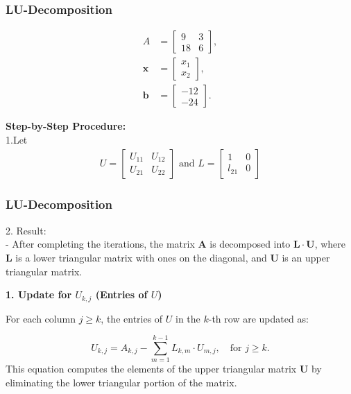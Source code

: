 \documentclass{beamer}
\theoremstyle{remark}
\numberwithin{equation}{section}
\begin{document}
\begin{frame}
\frametitle{LU-Decomposition}


\begin{align}
		A &= \begin{bmatrix} 9 & 3 \\ 18 & 6 \end{bmatrix}, \\
		\mathbf{x} &= \begin{bmatrix} x_1 \\ x_2 \end{bmatrix}, \\
		\mathbf{b} &= \begin{bmatrix} -12 \\ -24 \end{bmatrix}.
	\end{align}
	
    \textbf{Step-by-Step Procedure:}\\
1.Let 
\begin{align}
U= \begin{bmatrix} U_{11} & U_{12} \\ U_{21} & U_{22} \end{bmatrix} \text{ and } L= \begin{bmatrix} 1 & 0 \\ l_{21} & 0 \end{bmatrix}
\end{align}

\end{frame}

\begin{frame}
\frametitle{LU-Decomposition}
  
2. Result:\\
   - After completing the iterations, the matrix $ \mathbf{A} $ is decomposed into $ \mathbf{L} \cdot \mathbf{U} $, where $ \mathbf{L} $ is a lower triangular matrix with ones on the diagonal, and $ \mathbf{U} $ is an upper triangular matrix.

\textbf{1. Update for $ U_{k,j} $ (Entries of $ U $)}

For each column $ j \geq k $, the entries of $ U $ in the $ k $-th row are updated as:

\[
U_{k,j} = A_{k,j} - \sum_{m=1}^{k-1} L_{k,m} \cdot U_{m,j}, \quad \text{for } j \geq k.
\]
This equation computes the elements of the upper triangular matrix $ \mathbf{U} $ by eliminating the lower triangular portion of the matrix.

\end{frame}
\end{document}
